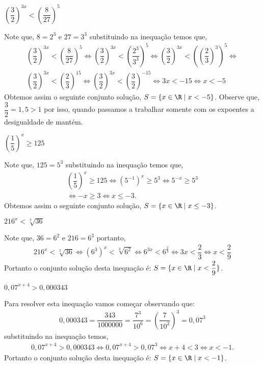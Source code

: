   \begin{exem}
  $\left( \dfrac{3}{2} \right)^{3x} < \left( \dfrac{8}{27} \right)^5$
  
  Note que, $8= 2^3$ e $27= 3^3$ substituindo na inequação temos que,
  \begin{eqnarray*}
  \left( \dfrac{3}{2} \right)^{3x} < \left( \dfrac{8}{27} \right)^5 \Leftrightarrow
  \left( \dfrac{3}{2} \right)^{3x} < \left( \dfrac{2^3}{3^3} \right)^5 \Leftrightarrow
  \left( \dfrac{3}{2} \right)^{3x} < \left(\left( \dfrac{2}{3}\right)^3 \right)^5 \Leftrightarrow \\
  \left( \dfrac{3}{2} \right)^{3x} < \left(\dfrac{2}{3} \right)^{15} \Leftrightarrow
  \left( \dfrac{3}{2} \right)^{3x} < \left(\dfrac{3}{2} \right)^{-15} \Leftrightarrow
   3x < -15 \Leftrightarrow x < -5
  \end{eqnarray*}
  Obtemos assim o seguinte conjunto solução, $S= \{x \in \R \mid x < -5 \}$.
  Observe que, $\dfrac{3}{2}= 1,5 > 1$ por isso, quando passamos a trabalhar somente com os expoentes a desigualdade de mantém.
  \end{exem}
  
  \begin{exem}
  $\left( \dfrac{1}{5} \right)^x \geq 125$
  
  Note que, $125= 5^3$ substituindo na inequação temos que,
  \begin{eqnarray*}
  \left( \dfrac{1}{5} \right)^x \geq 125 \Leftrightarrow
  \left( 5^{-1} \right)^x \geq 5^3 \Leftrightarrow
  5^{-x} \geq 5^3 \\
  \Leftrightarrow -x \geq 3 \Leftrightarrow x \leq -3.
  \end{eqnarray*}
  Obtemos assim o seguinte conjunto solução, $S= \{x \in \R \mid x \leq -3 \}$.
  \end{exem}
  
  \begin{exem}
  $216^x < \sqrt[3]{36}$
  
  Note que, $36= 6^2$ e $216= 6^3$ portanto,
  \begin{eqnarray*}
  216^x < \sqrt[3]{36} \Leftrightarrow (6^3)^x < \sqrt[3]{6^2} \Leftrightarrow 
  6^{3x} < 6^{\frac{2}{3}}  \Leftrightarrow 3x < \dfrac{2}{3} \Leftrightarrow 
  x < \dfrac{2}{9}
  \end{eqnarray*}
  Portanto o conjunto solução desta inequação é: $S= \{x \in \R \mid x < \dfrac{2}{9} \}$.
  \end{exem}
  
  \begin{exem}
  $0,07^{x+4} > 0,000343$
  
  Para resolver esta inequação vamos começar observando que:
  \begin{eqnarray*}
  0,000343= \dfrac{343}{1000000}= \dfrac{7^3}{10^6}= \left(\dfrac{7}{10^2}\right)^3= 0,07^3
  \end{eqnarray*}
  substituindo na inequação temos,
  \begin{eqnarray*}
  0,07^{x+4} > 0,000343 \Leftrightarrow 0,07^{x+4} > 0,07^3 \Leftrightarrow x+4 < 3 \Leftrightarrow x < -1.
  \end{eqnarray*}
  Portanto o conjunto solução desta inequação é: $S= \{x \in \R \mid x < -1 \}$.
  \end{exem}
  
